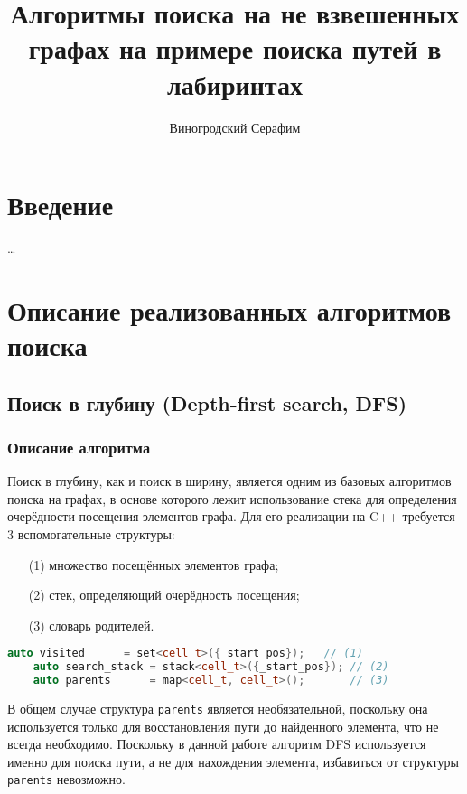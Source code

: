 \documentclass[a4paper, 12pt]{article}
\title{Алгоритмы поиска на не взвешенных графах на примере поиска путей в лабиринтах}
\author{Виногродский Серафим}
\begin{document}
\begin{titlepage}
    \maketitle
    \tableofcontents
    \thispagestyle{empty}
\end{titlepage}

\section{Введение}
\ldots

\section{Описание реализованных алгоритмов поиска}
\subsection{Поиск в глубину (Depth-first search, DFS)}
\subsubsection{Описание алгоритма}
\label{ssub:DFS_algorithm}
Поиск в глубину, как и поиск в ширину, является одним из базовых алгоритмов поиска на графах, в основе которого лежит использование стека для определения очерёдности посещения элементов графа. Для его реализации на C++ требуется 3 вспомогательные структуры:
\begin{itemize}
    \item[(1)] множество посещённых элементов графа;
    \item[(2)] стек, определяющий очерёдность посещения;
    \item[(3)] словарь родителей.
\end{itemize}

\begin{lstlisting}[language=C++]
    auto visited      = set<cell_t>({_start_pos});   // (1)
    auto search_stack = stack<cell_t>({_start_pos}); // (2)
    auto parents      = map<cell_t, cell_t>();       // (3)
\end{lstlisting}

В общем случае структура \verb|parents| является необязательной, поскольку она используется только для восстановления пути до найденного элемента, что не всегда необходимо. Поскольку в данной работе алгоритм DFS используется именно для поиска пути, а не для нахождения элемента, избавиться от структуры \verb|parents| невозможно.
\end{document}
